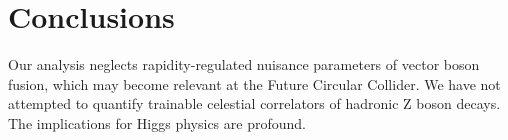\section{Conclusions}\label{sec:conclusions}

Our analysis neglects rapidity-regulated nuisance parameters of vector
boson fusion, which may become relevant at the Future Circular Collider.
We have not attempted to quantify trainable celestial correlators of
hadronic Z boson decays. The implications for Higgs physics are
profound.

